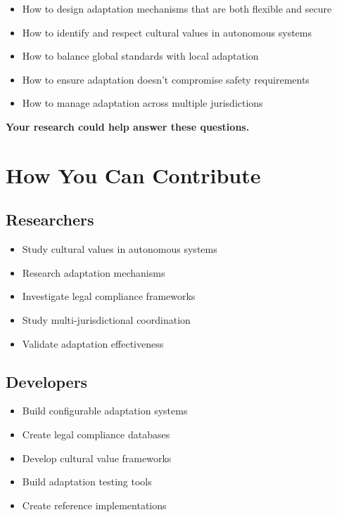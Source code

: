 \begin{itemize}
    \item How to design adaptation mechanisms that are both flexible and secure
    
    \item How to identify and respect cultural values in autonomous systems
    
    \item How to balance global standards with local adaptation
    
    \item How to ensure adaptation doesn't compromise safety requirements
    
    \item How to manage adaptation across multiple jurisdictions
\end{itemize}

\textbf{Your research could help answer these questions.}

\vspace{0.5cm}

\section{How You Can Contribute}

\subsection{Researchers}

\begin{itemize}
    \item Study cultural values in autonomous systems
    \item Research adaptation mechanisms
    \item Investigate legal compliance frameworks
    \item Study multi-jurisdictional coordination
    \item Validate adaptation effectiveness
\end{itemize}

\subsection{Developers}

\begin{itemize}
    \item Build configurable adaptation systems
    \item Create legal compliance databases
    \item Develop cultural value frameworks
    \item Build adaptation testing tools
    \item Create reference implementations
\end{itemize}

